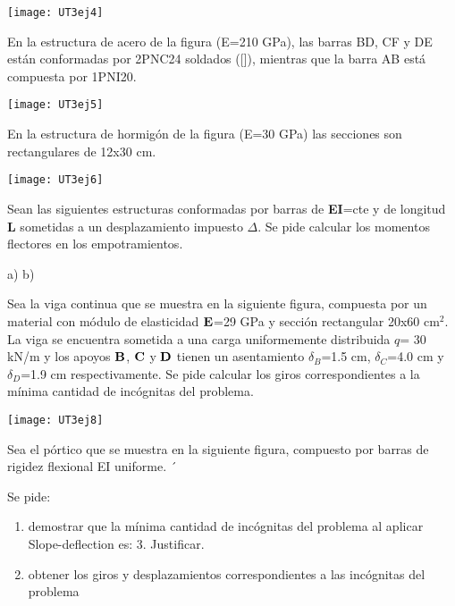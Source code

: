 \begin{center}
	\texttt{[image: UT3ej4]}
\end{center}


\ejercicio

En la estructura de acero de la figura (E=210 GPa), las barras BD, CF y DE están conformadas por 2PNC24 soldados ([]), mientras que la barra AB está compuesta por 1PNI20. 


\begin{center}
	\texttt{[image: UT3ej5]}
\end{center}



\ejercicio 

En la estructura de hormigón de la figura (E=30 GPa) las secciones son rectangulares de 12x30 cm. 

\begin{center}
	\texttt{[image: UT3ej6]}
\end{center}


\ejercicio


Sean las siguientes estructuras conformadas por barras de \textbf{EI}=cte y de longitud \textbf{L} sometidas a un desplazamiento impuesto $\Delta$. Se pide calcular los momentos flectores en los empotramientos.


\begin{center}
	\def\svgwidth{0.45\textwidth}
	a) 
	\def\svgwidth{0.45\textwidth}
	b) 
\end{center}

\ejercicio

Sea la viga continua que se muestra en la siguiente figura, compuesta por un material con módulo de elasticidad $\bf E$=29 GPa y sección rectangular 20x60 cm$^2$. La viga se encuentra sometida a una carga uniformemente distribuida $q$= 30 kN/m y los apoyos $\bf B$, $\bf C$ y $\bf D$ tienen un asentamiento $\delta_B$=1.5 cm, $\delta_C$=4.0 cm y $\delta_D$=1.9 cm respectivamente. Se pide calcular los giros correspondientes a la mínima cantidad de incógnitas del problema.

\begin{center}
	\texttt{[image: UT3ej8]}
\end{center}

\ejercicio

Sea el pórtico que se muestra en la siguiente figura, compuesto por barras de rigidez flexional EI uniforme. 
´
\begin{center}
	 \def\svgwidth{0.7\textwidth}
	
\end{center}

Se pide:

\begin{enumerate}
	\item demostrar que la mínima cantidad de incógnitas del problema al aplicar Slope-deflection es: 3. Justificar.
	\item obtener los giros y desplazamientos correspondientes a las incógnitas del problema
\end{enumerate}
 